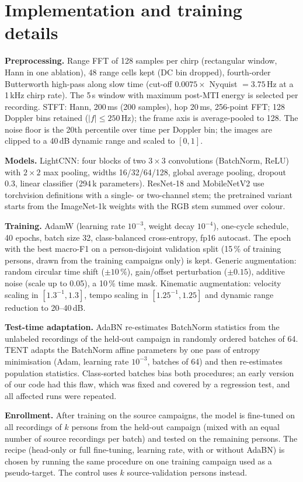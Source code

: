 \documentclass[11pt,a4paper]{article}
\begin{document}
\section{Implementation and training details}
\textbf{Preprocessing.} Range FFT of 128 samples per chirp (rectangular window, Hann in one ablation), 48 range cells kept (DC bin dropped), fourth-order Butterworth high-pass along slow time (cut-off $0.0075\times$ Nyquist $=3.75$\,Hz at a 1\,kHz chirp rate). The 5\,s window with maximum post-MTI energy is selected per recording. STFT: Hann, 200\,ms (200 samples), hop 20\,ms, 256-point FFT; 128 Doppler bins retained ($|f|\le250$\,Hz); the frame axis is average-pooled to 128. The noise floor is the 20th percentile over time per Doppler bin; the images are clipped to a 40\,dB dynamic range and scaled to $[0,1]$.

\textbf{Models.} LightCNN: four blocks of two $3{\times}3$ convolutions (BatchNorm, ReLU) with $2{\times}2$ max pooling, widths 16/32/64/128, global average pooling, dropout 0.3, linear classifier (294\,k parameters). ResNet-18 and MobileNetV2 use torchvision definitions with a single- or two-channel stem; the pretrained variant starts from the ImageNet-1k weights with the RGB stem summed over colour.

\textbf{Training.} AdamW (learning rate $10^{-3}$, weight decay $10^{-4}$), one-cycle schedule, 40 epochs, batch size 32, class-balanced cross-entropy, fp16 autocast. The epoch with the best macro-F1 on a person-disjoint validation split (15\,\% of training persons, drawn from the training campaigns only) is kept. Generic augmentation: random circular time shift ($\pm10\,\%$), gain/offset perturbation ($\pm0.15$), additive noise (scale up to 0.05), a 10\,\% time mask. Kinematic augmentation: velocity scaling in $[1.3^{-1},1.3]$, tempo scaling in $[1.25^{-1},1.25]$ and dynamic range reduction to 20--40\,dB.

\textbf{Test-time adaptation.} AdaBN re-estimates BatchNorm statistics from the unlabeled recordings of the held-out campaign in randomly ordered batches of 64. TENT adapts the BatchNorm affine parameters by one pass of entropy minimisation (Adam, learning rate $10^{-3}$, batches of 64) and then re-estimates population statistics. Class-sorted batches bias both procedures; an early version of our code had this flaw, which was fixed and covered by a regression test, and all affected runs were repeated.

\textbf{Enrollment.} After training on the source campaigns, the model is fine-tuned on all recordings of $k$ persons from the held-out campaign (mixed with an equal number of source recordings per batch) and tested on the remaining persons. The recipe (head-only or full fine-tuning, learning rate, with or without AdaBN) is chosen by running the same procedure on one training campaign used as a pseudo-target. The control uses $k$ source-validation persons instead.
\end{document}
